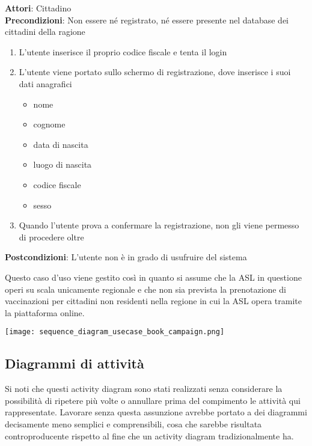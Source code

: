\documentclass{article}
\begin{document}
\begin{framed}
    \noparskip{}
    \textbf{Attori}: Cittadino\\
    \textbf{Precondizioni}: Non essere né registrato, né essere presente nel database dei cittadini della ragione
    \begin{enumerate}
        \item L'utente inserisce il proprio codice fiscale e tenta il login
        \item L'utente viene portato sullo schermo di registrazione, dove inserisce i suoi dati anagrafici
            \begin{itemize}
                \item nome
                \item cognome
                \item data di nascita
                \item luogo di nascita
                \item codice fiscale
                \item sesso
            \end{itemize}
        \item Quando l'utente prova a confermare la registrazione, non gli viene permesso di procedere oltre
    \end{enumerate}
    \textbf{Postcondizioni}: L'utente non è in grado di usufruire del sistema
\end{framed}

Questo caso d'uso viene gestito così in quanto si assume che la ASL in questione operi su scala unicamente regionale e che non sia prevista la prenotazione di vaccinazioni per cittadini non residenti nella regione in cui la ASL opera tramite la piattaforma online.

\begin{center}
    \texttt{[image: sequence\_diagram\_usecase\_book\_campaign.png]}
\end{center}

\subsection{Diagrammi di attività}

Si noti che questi activity diagram sono stati realizzati senza considerare la possibilità di ripetere più volte o annullare prima del compimento le attività qui rappresentate. Lavorare senza questa assunzione avrebbe portato a dei diagrammi decisamente meno semplici e comprensibili, cosa che sarebbe risultata controproducente rispetto al fine che un activity diagram tradizionalmente ha.
\end{document}
